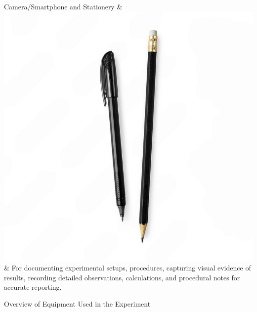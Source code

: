 \documentclass{article}
\begin{document}
\begin{table}[H]
\begin{tblr}
        Camera/Smartphone and Stationery & \includegraphics[width=\imas,valign=c]{images/stationary.png} & For documenting experimental setups, procedures, capturing visual evidence of results, recording detailed observations, calculations, and procedural notes for accurate reporting. \\
    \end{tblr}
    \caption{Overview of Equipment Used in the Experiment}
    \label{tab:equipment_overview}
\end{table}

    

\newcommand{\mr}[2]{%
    \begin{varwidth}{#2}%
        #1%
    \end{varwidth}%
}

\newpage
\end{document}
